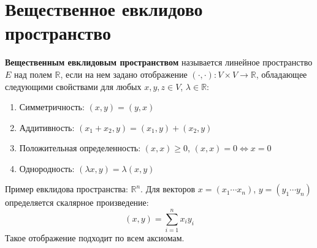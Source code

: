 \documentclass[14pt]{extreport}
\begin{document}
    \chapter{Вещественное евклидово пространство}

    \begin{defbox}
        \textbf{Вещественным евклидовым пространством} называется линейное пространство $E$ над полем $\mathbb{R}$, если на нем задано отображение $(\cdot, \cdot):V \times V \rightarrow \mathbb{R}$, обладающее следующими свойствами для любых $x, y, z \in V$, $\lambda \in \mathbb{R}$:
        \begin{enumerate}
            \item Симметричность: $(x, y) = (y, x)$
            \item Аддитивность: $(x_1 + x_2, y) = (x_1, y) + (x_2, y)$
            \item Положительная определенность: $(x, x) \ge 0$, $(x, x) = 0 \Leftrightarrow x = 0$
            \item Однородность: $(\lambda x, y) = \lambda (x, y)$
        \end{enumerate}
    \end{defbox}

    Пример евклидова пространства: $\mathbb{R}^n$. Для векторов $x = (x_1\cdots x_n)$, $y = (y_1\cdots y_n)$ определяется скалярное произведение:
    $$
    (x, y) = \sum_{i=1}^n x_iy_i
    $$
    Такое отображение подходит по всем аксиомам.
\end{document}
